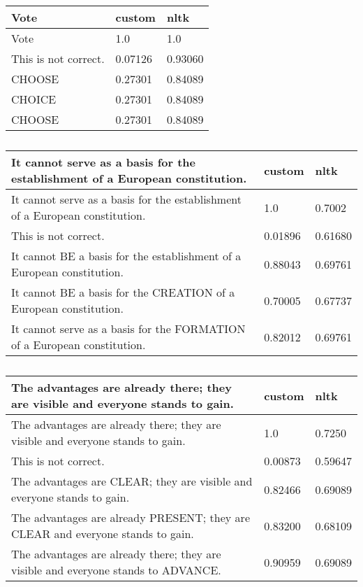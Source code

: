 \documentclass[a4paper,landscape]{article}
\begin{document}
\begin{table}
  \begin{tabular}{l l l}
    \toprule
    Vote & custom & nltk \\
    \midrule 
    Vote & 1.0 & 1.0 \\
    This is not correct. & 0.07126 & 0.93060 \\
    CHOOSE & 0.27301 & 0.84089 \\
    CHOICE & 0.27301 & 0.84089 \\
    CHOOSE & 0.27301 & 0.84089 \\
    \bottomrule
  \end{tabular}
  \caption{}
\end{table}

\begin{table}
  \begin{tabular}{l l l}
    \toprule
    It cannot serve as a basis for the establishment of a European constitution. & custom & nltk \\
    \midrule
    It cannot serve as a basis for the establishment of a European constitution. & 1.0 & 0.7002 \\
    This is not correct. & 0.01896 & 0.61680 \\
    It cannot BE a basis for the establishment of a European constitution. & 0.88043 & 0.69761 \\
    It cannot BE a basis for the CREATION of a European constitution. & 0.70005 & 0.67737 \\
    It cannot serve as a basis for the FORMATION of a European constitution. & 0.82012 & 0.69761 \\
    \bottomrule
  \end{tabular}
  \caption{}
\end{table}

\begin{table}
    \begin{tabular}{l l l}
      \toprule
      The advantages are already there; they are visible and everyone stands to gain. & custom & nltk \\
      \midrule
      The advantages are already there; they are visible and everyone stands to gain. & 1.0 & 0.7250 \\
      This is not correct. & 0.00873 & 0.59647 \\
      The advantages are CLEAR; they are visible and everyone stands to gain. & 0.82466 & 0.69089 \\
      The advantages are already PRESENT; they are CLEAR and everyone stands to gain. & 0.83200 & 0.68109 \\
      The advantages are already there; they are visible and everyone stands to ADVANCE. & 0.90959 & 0.69089 \\
      \bottomrule
    \end{tabular}
  \caption{}
\end{table}
\end{document}
